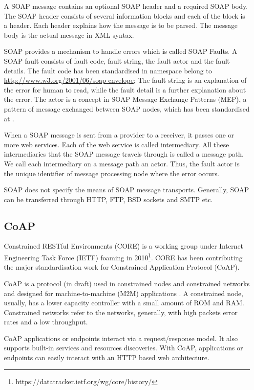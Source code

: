 A SOAP message contains an optional SOAP header and a required SOAP body. The SOAP header consists of several information blocks and each of the block is a header. Each header explains how the message is to be parsed. The message body is the actual message in XML syntax. 

SOAP provides a mechanism to handle errors which is called SOAP Faults. A SOAP fault consists of fault code, fault string, the fault actor and the fault details. The fault code has been standardised in namespace belong to \url{http://www.w3.org/2001/06/soap-envelope}; The fault string is an explanation of the error for human to read, while the fault detail is a further explanation about the error. The actor is a concept in SOAP Message Exchange Patterns (MEP), a pattern of message exchanged between SOAP nodes, which has been standardised at \cite{booth2007web}.

When a SOAP message is sent from a provider to a receiver, it passes one or more web services. Each of the web service is called intermediary. All these intermediaries that the SOAP message travels through is called a message path. We call each intermediary on a message path an actor. Thus, the fault actor is the unique identifier of message processing node where the error occurs. 

SOAP does not specify the means of SOAP message transports. Generally, SOAP can be transferred through HTTP, FTP, BSD sockets and SMTP etc. 

\subsection{CoAP}
Constrained RESTful Environments (CORE) is a working group under Internet Engineering Task Force (IETF) foaming in 2010\footnote{https://datatracker.ietf.org/wg/core/history/}. CORE has been contributing the major standardisation work for Constrained Application Protocol (CoAP). 

CoAP is a protocol (in draft) used in constrained nodes and constrained networks and designed for machine-to-machine (M2M) applications \cite{shelby2013constrained}. A constrained node, usually, has a lower capacity controller with a small amount of ROM and RAM. Constrained networks refer to the networks, generally, with high packets error rates and a low throughput.

CoAP applications or endpoints interact via a request/response model. It also supports built-in services and resources discoveries. With CoAP, applications or endpoints can easily interact with an HTTP based web architecture. \cite{shelby2013constrained} 

